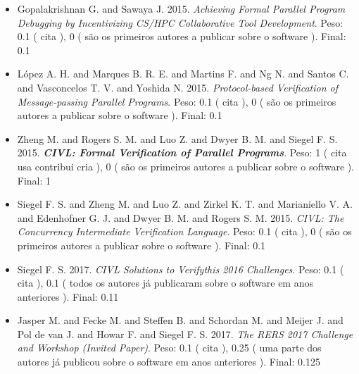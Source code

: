 \begin{itemize}
\item Gopalakrishnan G. and Sawaya J.
      2015.
        \textit{ Achieving Formal Parallel Program Debugging by Incentivizing CS/HPC Collaborative Tool Development}.
      Peso:
      0.1 (
          cita
      ),
      0 (
são os primeiros autores a publicar sobre o software
      ).
      Final:
      0.1

\item L\'{o}pez A. H. and Marques B. R. E. and Martins F. and Ng N. and Santos C. and Vasconcelos T. V. and Yoshida N.
      2015.
        \textit{ Protocol-based Verification of Message-passing Parallel Programs}.
      Peso:
      0.1 (
          cita
      ),
      0 (
são os primeiros autores a publicar sobre o software
      ).
      Final:
      0.1

\item Zheng M. and Rogers S. M. and Luo Z. and Dwyer B. M. and Siegel F. S.
      2015.
        \textbf{\textit{ CIVL: Formal Verification of Parallel Programs}}.
      Peso:
      1 (
          cita
          usa
          contribui
          cria
      ),
      0 (
são os primeiros autores a publicar sobre o software
      ).
      Final:
      1

\item Siegel F. S. and Zheng M. and Luo Z. and Zirkel K. T. and Marianiello V. A. and Edenhofner G. J. and Dwyer B. M. and Rogers S. M.
      2015.
        \textit{ CIVL: The Concurrency Intermediate Verification Language}.
      Peso:
      0.1 (
          cita
      ),
      0 (
são os primeiros autores a publicar sobre o software
      ).
      Final:
      0.1

\item Siegel F. S.
      2017.
        \textit{ CIVL Solutions to Verifythis 2016 Challenges}.
      Peso:
      0.1 (
          cita
      ),
      0.1 (
todos os autores já publicaram sobre o software em anos anteriores
      ).
      Final:
      0.11

\item Jasper M. and Fecke M. and Steffen B. and Schordan M. and Meijer J. and Pol de van J. and Howar F. and Siegel F. S.
      2017.
        \textit{ The RERS 2017 Challenge and Workshop (Invited Paper)}.
      Peso:
      0.1 (
          cita
      ),
      0.25 (
uma parte dos autores já publicou sobre o software em anos anteriores
      ).
      Final:
      0.125

\end{itemize}

